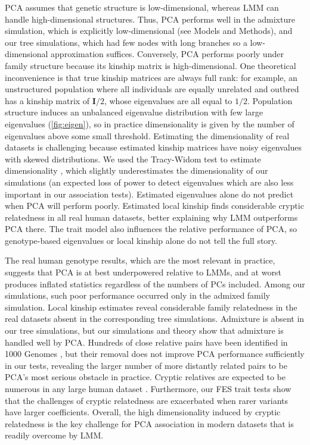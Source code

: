 \documentclass[11pt]{article}
\begin{document}
PCA assumes that genetic structure is low-dimensional, whereas LMM can handle high-dimensional structures.
Thus, PCA performs well in the admixture simulation, which is explicitly low-dimensional (see Models and Methods), and our tree simulations, which had few nodes with long branches so a low-dimensional approximation suffices.
Conversely, PCA performs poorly under family structure because its kinship matrix is high-dimensional.
One theoretical inconvenience is that true kinship matrices are always full rank: for example, an unstructured population where all individuals are equally unrelated and outbred has a kinship matrix of $\mathbf{I}/2$, whose eigenvalues are all equal to $1/2$.
Population structure induces an unbalanced eigenvalue distribution with few large eigenvalues (\cref{fig:eigen}), so in practice dimensionality is given by the number of eigenvalues above some small threshold.
Estimating the dimensionality of real datasets is challenging because estimated kinship matrices have noisy eigenvalues with skewed distributions.
We used the Tracy-Widom test to estimate dimensionality \citep{patterson_population_2006}, which slightly underestimates the dimensionality of our simulations (an expected loss of power to detect eigenvalues which are also less important in our association tests).
Estimated eigenvalues alone do not predict when PCA will perform poorly.
Estimated local kinship finds considerable cryptic relatedness in all real human datasets, better explaining why LMM outperforms PCA there.
The trait model also influences the relative performance of PCA, so genotype-based eigenvalues or local kinship alone do not tell the full story.

The real human genotype results, which are the most relevant in practice, suggests that PCA is at best underpowered relative to LMMs, and at worst produces inflated statistics regardless of the numbers of PCs included.
Among our simulations, such poor performance occurred only in the admixed family simulation.
Local kinship estimates reveal considerable family relatedness in the real datasets absent in the corresponding tree simulations.
Admixture is absent in our tree simulations, but our simulations and theory show that admixture is handled well by PCA.
Hundreds of close relative pairs have been identified in 1000 Genomes \citep{gazal_high_2015, al-khudhair_inference_2015, fedorova_atlas_2016, schlauch_identification_2017}, but their removal does not improve PCA performance sufficiently in our tests, revealing the larger number of more distantly related pairs to be PCA's most serious obstacle in practice.
Cryptic relatives are expected to be numerous in any large human dataset \citep{henn_cryptic_2012, shchur_number_2018}.
Furthermore, our FES trait tests show that the challenges of cryptic relatedness are exacerbated when rarer variants have larger coefficients.
Overall, the high dimensionality induced by cryptic relatedness is the key challenge for PCA association in modern datasets that is readily overcome by LMM.
\end{document}

